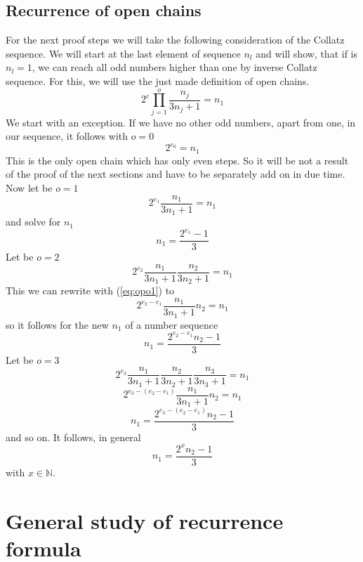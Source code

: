 \documentclass{aomart}
\theoremstyle{definition}
\begin{document}
\subsection{Recurrence of open chains}
\label{ss:it_opch}
For the next proof steps we will take the following consideration of the Collatz sequence. We will start at the last element of sequence $n_{l}$ and will show, that if is $n_{l}=1$, we can reach all odd numbers higher than one by inverse Collatz sequence. For this, we will use the just made definition of open chains. 
\begin{equation}\label{eq:opone}
	2^{e} \prod_{j=1}^{o} \frac{n_{j}}{3n_{j}+1} = n_{1}
\end{equation}
We start with an exception. If we have no other odd numbers, apart from one, in our sequence, it follows with $o=0$
\begin{equation}\label{eq:opo0}
	2^{e_{0}} = n_{1} 
\end{equation}
This is the only open chain which has only even steps. So it will be not a result of the proof of the next sections and have to be separately add on in due time. Now let be $o=1$
\[ 2^{e_{1}} \frac{n_{1}}{3n_{1}+1} = n_{1} \]
and solve for $n_{1}$
\begin{equation}\label{eq:opo1}
	n_{1} = \frac{2^{e_{1}}-1}{3}
\end{equation}
Let be $o=2$
\[ 2^{e_{2}} \frac{n_{1}}{3n_{1}+1} \frac{n_{2}}{3n_{2}+1} = n_{1} \]
This we can rewrite with (\ref{eq:opo1}) to 
\[ 2^{e_{2}-e_{1}} \frac{n_{1}}{3n_{1}+1} n_{2} = n_{1} \]
so it follows for the new $n_{1}$ of a number sequence 
\begin{equation}\label{eq:opo2}
	n_{1} = \frac{2^{e_{2}-e_{1}}n_{2}-1}{3}
\end{equation}
Let be $o=3$
\[ 2^{e_{3}} \frac{n_{1}}{3n_{1}+1} \frac{n_{2}}{3n_{2}+1} \frac{n_{3}}{3n_{3}+1} = n_{1} \]
\[ 2^{e_{3}-(e_{2}-e_{1})} \frac{n_{1}}{3n_{1}+1} n_{2} = n_{1} \]
\begin{equation}\label{eq:opo3}
	n_{1} = \frac{2^{e_{3}-(e_{2}-e_{1})}n_{2}-1}{3}
\end{equation}
and so on. It follows, in general
\begin{equation}\label{eq:opngen}
	n_{1} = \frac{2^{x}n_{2}-1}{3}
\end{equation}
with $x \in \mathbb{N}$.
\section{General study of recurrence formula}
\label{s:stitfor}
\end{document}
